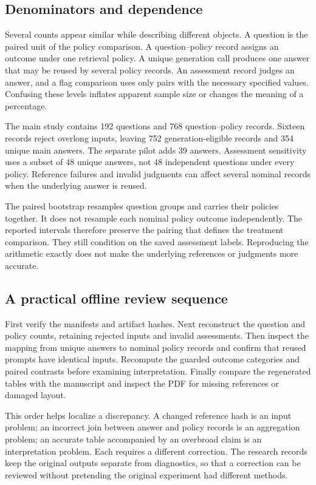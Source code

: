 \subsection{Denominators and dependence}

Several counts appear similar while describing different objects. A question is the paired unit of the policy comparison. A question--policy record assigns an outcome under one retrieval policy. A unique generation call produces one answer that may be reused by several policy records. An assessment record judges an answer, and a flag comparison uses only pairs with the necessary specified values. Confusing these levels inflates apparent sample size or changes the meaning of a percentage.

The main study contains 192 questions and 768 question--policy records. Sixteen records reject overlong inputs, leaving 752 generation-eligible records and 354 unique main answers. The separate pilot adds 39 answers. Assessment sensitivity uses a subset of 48 unique answers, not 48 independent questions under every policy. Reference failures and invalid judgments can affect several nominal records when the underlying answer is reused.

The paired bootstrap resamples question groups and carries their policies together. It does not resample each nominal policy outcome independently. The reported intervals therefore preserve the pairing that defines the treatment comparison. They still condition on the saved assessment labels. Reproducing the arithmetic exactly does not make the underlying references or judgments more accurate.

\subsection{A practical offline review sequence}

First verify the manifests and artifact hashes. Next reconstruct the question and policy counts, retaining rejected inputs and invalid assessments. Then inspect the mapping from unique answers to nominal policy records and confirm that reused prompts have identical inputs. Recompute the guarded outcome categories and paired contrasts before examining interpretation. Finally compare the regenerated tables with the manuscript and inspect the PDF for missing references or damaged layout.

This order helps localize a discrepancy. A changed reference hash is an input problem; an incorrect join between answer and policy records is an aggregation problem; an accurate table accompanied by an overbroad claim is an interpretation problem. Each requires a different correction. The research records keep the original outputs separate from diagnostics, so that a correction can be reviewed without pretending the original experiment had different methods.

